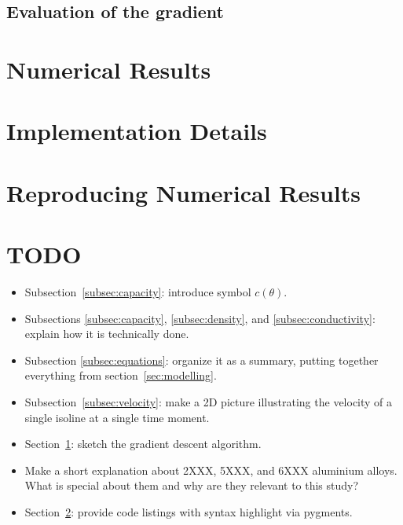 \subsection{Evaluation of the gradient}

\section{Numerical Results}
\label{sec:numericals}

\appendix

\section{Implementation Details}
\label{sec:implementation}

\section{Reproducing Numerical Results}


\section{TODO}
\begin{itemize}
	\item Subsection~\ref{subsec:capacity}: introduce symbol $c(\theta)$.
	\item Subsections \ref{subsec:capacity}, \ref{subsec:density}, and \ref{subsec:conductivity}: explain how it is technically done.
	\item Subsection \ref{subsec:equations}: organize it as a summary, putting together everything from section~\ref{sec:modelling}.
	\item Subsection~\ref{subsec:velocity}: make a 2D picture illustrating the velocity of a single isoline at a single time moment.
	\item Section~\ref{sec:numericals}: sketch the gradient descent algorithm.
	\item Make a short explanation about 2XXX, 5XXX, and 6XXX aluminium alloys. What is special about them and why are they relevant to this study?
	\item Section~\ref{sec:implementation}: provide code listings with syntax highlight via pygments.
\end{itemize}